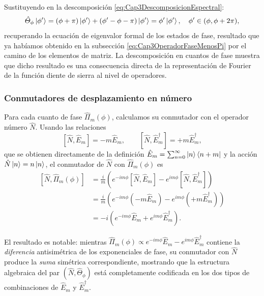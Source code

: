                 Sustituyendo en la descomposición \ref{eq:Cap3DescomposicionEspectral}:
                \begin{equation}\label{eq:Cap3EigenvalorFase}
                    \hat{\Theta}_\phi\ket{\phi'} = (\phi+\pi)\ket{\phi'} + (\phi'-\phi-\pi)\ket{\phi'} = \phi'\ket{\phi'}, \quad \phi' \in (\phi,\phi+2\pi),
                \end{equation}
                recuperando la ecuación de eigenvalor formal de los estados de fase, resultado que ya habíamos obtenido en la subsección \ref{eq:Cap3OperadorFaseMenosPi} por el camino de los elementos de matriz. La descomposición en cuantos de fase muestra que dicho resultado es una consecuencia directa de la representación de Fourier de la función diente de sierra al nivel de operadores.

            \subsubsection{Conmutadores de desplazamiento en número}

                Para cada cuanto de fase $\hat{\Pi}_m(\phi)$, calculamos su conmutador con el operador número $\hat{N}$. Usando las relaciones
                \begin{equation*}
                    \left[\hat{N}, \hat{E}_m\right] = -m\hat{E}_m, \qquad \left[\hat{N}, \hat{E}_m^\dagger\right] = +m\hat{E}_m^\dagger,
                \end{equation*}
                que se obtienen directamente de la definición $\hat{E}_m = \sum_{n=0}^{\infty}\ket{n}\bra{n+m}$ y la acción $\hat{N}\ket{n} = n\ket{n}$, el conmutador de $\hat{N}$ con $\hat{\Pi}_m(\phi)$ es
                \begin{align}
                    \left[\hat{N},\hat{\Pi}_m(\phi)\right] &= \frac{i}{m}\left(e^{-im\phi}\left[\hat{N},\hat{E}_m\right] - e^{im\phi}\left[\hat{N},\hat{E}_m^\dagger\right]\right)\nonumber\\
                    &= \frac{i}{m}\left(e^{-im\phi}(-m\hat{E}_m) - e^{im\phi}(+m\hat{E}_m^\dagger)\right)\nonumber\\
                    &= -i\left(e^{-im\phi}\hat{E}_m + e^{im\phi}\hat{E}_m^\dagger\right).
                    \label{eq:Cap3ConmutadorNPi}
                \end{align}

                El resultado es notable: mientras $\hat{\Pi}_m(\phi) \propto e^{-im\phi}\hat{E}_m - e^{im\phi}\hat{E}_m^\dagger$ contiene la \textit{diferencia} antisimétrica de los exponenciales de fase, su conmutador con $\hat{N}$ produce la \textit{suma} simétrica correspondiente, mostrando que la estructura algebraica del par $(\hat{N}, \hat{\Theta}_\phi)$ está completamente codificada en los dos tipos de combinaciones de $\hat{E}_m$ y $\hat{E}_m^\dagger$.

